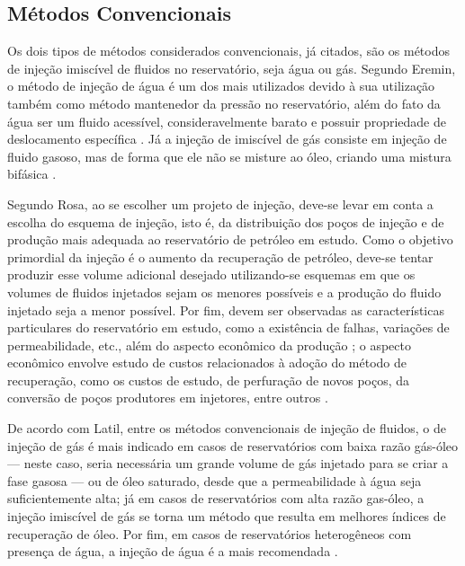 \subsection{M\'{e}todos Convencionais}
Os dois tipos de m\'{e}todos considerados convencionais, j\'{a} citados, s\~{a}o os m\'{e}todos de inje\c{c}\~{a}o imisc\'{i}vel de fluidos no reservat\'{o}rio, seja \'{a}gua ou g\'{a}s. Segundo Eremin, o m\'{e}todo de inje\c{c}\~{a}o de \'{a}gua \'{e} um dos mais utilizados devido \`{a} sua utiliza\c{c}\~{a}o tamb\'{e}m como m\'{e}todo mantenedor da press\~{a}o no reservat\'{o}rio, al\'{e}m do fato da \'{a}gua ser um fluido acess\'{i}vel, consideravelmente barato e possuir propriedade de deslocamento espec\'{i}fica \cite{eremin}. J\'{a} a inje\c{c}\~{a}o de imisc\'{i}vel de g\'{a}s consiste em inje\c{c}\~{a}o de fluido gasoso, mas de forma que ele n\~{a}o se misture ao \'{o}leo, criando uma mistura bif\'{a}sica \cite[p. 564]{engres}.

Segundo Rosa, ao se escolher um projeto de inje\c{c}\~{a}o, deve-se levar em conta a escolha do esquema de inje\c{c}\~{a}o, isto \'{e}, da distribui\c{c}\~{a}o dos po\c{c}os de inje\c{c}\~{a}o e de produ\c{c}\~{a}o mais adequada ao reservat\'{o}rio de petr\'{o}leo em estudo. Como o objetivo primordial da inje\c{c}\~{a}o \'{e} o aumento da recupera\c{c}\~{a}o de petr\'{o}leo, deve-se tentar produzir esse volume adicional desejado utilizando-se esquemas em que os volumes de fluidos injetados sejam os menores poss\'{i}veis e a produ\c{c}\~{a}o do fluido injetado seja a menor poss\'{i}vel. Por fim, devem ser observadas as caracter\'{i}sticas particulares do reservat\'{o}rio em estudo, como a exist\^{e}ncia de falhas, varia\c{c}\~{o}es de permeabilidade, etc., al\'{e}m do aspecto econ\^{o}mico da produ\c{c}\~{a}o \cite[p. 564]{engres}; o aspecto econ\^{o}mico envolve estudo de custos relacionados \`{a} ado\c{c}\~{a}o do m\'{e}todo de recupera\c{c}\~{a}o, como os custos de estudo, de perfura\c{c}\~{a}o de novos po\c{c}os, da convers\~{a}o de po\c{c}os produtores em injetores, entre outros \cite{latil}.

De acordo com Latil, entre os m\'{e}todos convencionais de inje\c{c}\~{a}o de fluidos, o de inje\c{c}\~{a}o de g\'{a}s \'{e} mais indicado em casos de reservat\'{o}rios com baixa raz\~{a}o g\'{a}s-\'{o}leo --- neste caso, seria necess\'{a}ria um grande volume de g\'{a}s injetado para se criar a fase gasosa --- ou de \'{o}leo saturado, desde que a permeabilidade \`{a} \'{a}gua seja suficientemente alta; j\'{a} em casos de reservat\'{o}rios com alta raz\~{a}o gas-\'{o}leo, a inje\c{c}\~{a}o imisc\'{i}vel de g\'{a}s se torna um m\'{e}todo que resulta em melhores \'{i}ndices de recupera\c{c}\~{a}o de \'{o}leo. Por fim, em casos de reservat\'{o}rios heterog\^{e}neos com presen\c{c}a de \'{a}gua, a inje\c{c}\~{a}o de \'{a}gua \'{e} a mais recomendada \cite{latil}. 

